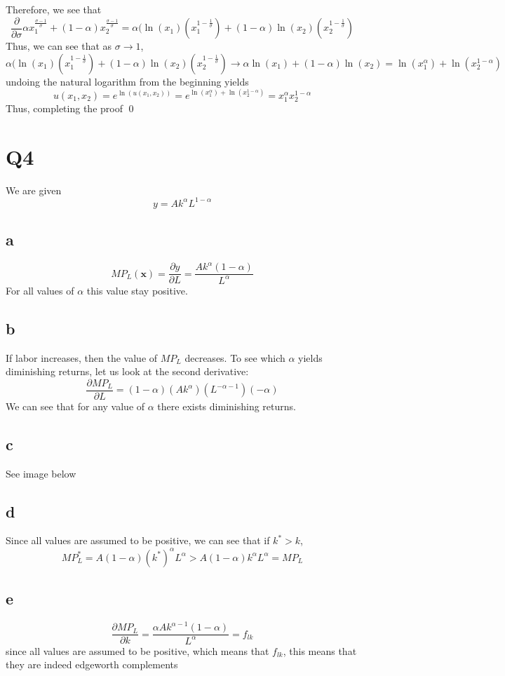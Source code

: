 \documentclass[12pt]{article}
\begin{document}
Therefore, we see that 
\[
    \frac{\partial }{\partial \sigma} \alpha x_1^{\frac{\sigma -1}{\sigma}} + (1-\alpha)x_2^{\frac{\sigma - 1}{\sigma}} =  \alpha(\ln(x_1) \left( x_1^{1-\frac{1}{\sigma}}\right) + (1-\alpha) \ln(x_2) \left( x_2^{1 - \frac{1}{\sigma}} \right) 
\]
Thus, we can see that as $\sigma \to 1$, 
\[
    \alpha(\ln(x_1) \left( x_1^{1-\frac{1}{\sigma}}\right) + (1-\alpha) \ln(x_2) \left( x_2^{1 - \frac{1}{\sigma}} \right) \to \alpha \ln(x_1) + (1-\alpha)\ln(x_2) = \ln(x_1^\alpha) + \ln(x_2^{1-\alpha})
\]
undoing the natural logarithm from the beginning yields
\[
u(x_1,x_2) = e^{\ln(u(x_1,x_2))} = e^{\ln(x_1^\alpha) + \ln(x_2^{1-\alpha})} = x_1^{\alpha} x_2^{1-\alpha}
\]
Thus, completing the proof \qed
\section*{Q4}
We are given 
\[
y = Ak^\alpha L^{1-\alpha}
\]
\subsection*{a}
\[
MP_L(\mathbf{x}) = \frac{\partial y}{\partial L} = \frac{A k^\alpha(1-\alpha)}{L^{\alpha}}
\]
For all values of $\alpha$  this value stay positive. 
\subsection*{b}
If labor increases, then the value of $MP_L$ decreases. To see which $\alpha$ yields diminishing returns, let us look at the second derivative:
\[
    \frac{\partial MP_L}{\partial L} = (1-\alpha)(Ak^\alpha)(L^{-\alpha -1})(-\alpha) 
\]
We can see that for any value of $\alpha$ there exists diminishing returns. 
\subsection*{c}
See image below
\subsection*{d}
Since all values are assumed to be positive, we can see that if $k^* > k$,
\[
MP^*_L = A(1-\alpha)(k^*)^\alpha L^\alpha > A(1-\alpha)k^\alpha L^\alpha = MP_L
\]
\subsection*{e}
\[
\frac{\partial MP_L}{\partial k} = \frac{\alpha A k^{\alpha -1}(1-\alpha)}{L^\alpha} = f_{lk}
\]
since all values are assumed to be positive, which means that $f_{lk}$, this means that they are indeed edgeworth complements
\end{document}
